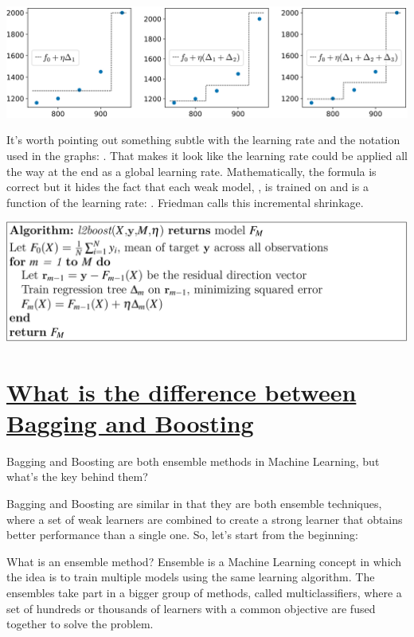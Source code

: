 \documentclass[]{book}
\theoremstyle{definition}
\theoremstyle{definition}
\theoremstyle{definition}
\theoremstyle{remark}
\begin{document}
\includegraphics[width=1\linewidth]{figures/L2-loss_examples_6}

It's worth pointing out something subtle with the learning rate and the
notation used in the graphs: . That makes it look like the learning rate
could be applied all the way at the end as a global learning rate.
Mathematically, the formula is correct but it hides the fact that each
weak model, , is trained on and is a function of the learning rate: .
Friedman calls this incremental shrinkage.

\includegraphics[width=1\linewidth]{figures/gbm-algorithm-l2-loss}

\section{\texorpdfstring{\href{https://quantdare.com/what-is-the-difference-between-bagging-and-boosting/}{What
is the difference between Bagging and
Boosting}}{What is the difference between Bagging and Boosting}}\label{what-is-the-difference-between-bagging-and-boosting}

Bagging and Boosting are both ensemble methods in Machine Learning, but
what's the key behind them?

Bagging and Boosting are similar in that they are both ensemble
techniques, where a set of weak learners are combined to create a strong
learner that obtains better performance than a single one. So, let's
start from the beginning:

What is an ensemble method? Ensemble is a Machine Learning concept in
which the idea is to train multiple models using the same learning
algorithm. The ensembles take part in a bigger group of methods, called
multiclassifiers, where a set of hundreds or thousands of learners with
a common objective are fused together to solve the problem.
\end{document}
